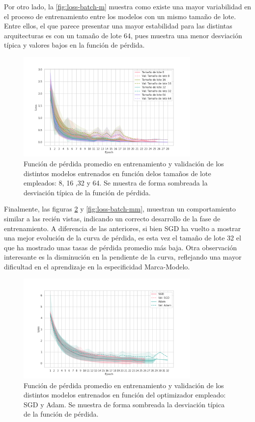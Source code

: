 Por otro lado, la \autoref{fig:loss-batch-m} muestra como existe una mayor variabilidad en el proceso de entrenamiento entre los modelos con un mismo tamaño de lote. Entre ellos, el que parece presentar una mayor estabilidad para las distintas arquitecturas es con un tamaño de lote 64, pues muestra una menor desviación típica y valores bajos en la función de pérdida.

\begin{figure}[H]
	\centering
	\includegraphics[width=0.8\textwidth]{img/loss-batch-marca.png}
	\caption{Función de pérdida promedio en entrenamiento y validación de los distintos modelos entrenados en función delos tamaños de lote empleados: 8, 16 ,32 y 64. Se muestra de forma sombreada la desviación típica de la función de pérdida.}
	\label{fig:loss-batch-m}
\end{figure}

Finalmente, las figuras \ref{fig:loss-optim-mm} y \ref{fig:loss-batch-mm}, muestran un comportamiento similar a las recién vistas, indicando un correcto desarrollo de la fase de entrenamiento. A diferencia de las anteriores, si bien SGD ha vuelto a mostrar una mejor evolución de la curva de pérdida, es esta vez el tamaño de lote 32 el que ha mostrado unas tasas de pérdida promedio más baja. Otra observación interesante es la disminución en la pendiente de la curva, reflejando una mayor dificultad en el aprendizaje en la especificidad Marca-Modelo.

\begin{figure}[H]
	\centering
	\includegraphics[width=0.8\textwidth]{img/loss-optimizer-marca-modelo.png}
	\caption{Función de pérdida promedio en entrenamiento y validación de los distintos modelos entrenados en función del optimizador empleado: SGD y Adam. Se muestra de forma sombreada la desviación típica de la función de pérdida.}
	\label{fig:loss-optim-mm}
\end{figure}

